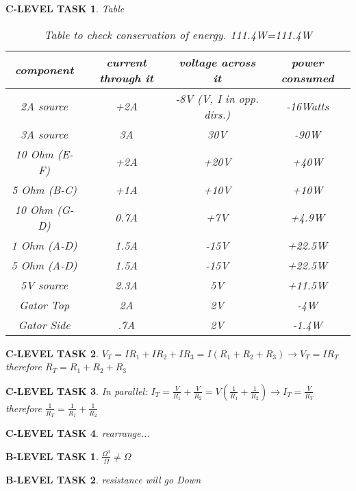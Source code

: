 \documentclass{book}
\numberwithin{equation}{section}
\newtheorem{blevel}{B-LEVEL TASK}
\newtheorem{clevel}{C-LEVEL TASK}
\theoremstyle{definition}
\begin{document}
\begin{clevel}Table\par
\begin{table}[H]
\begin{center}
\begin{tabular}{|c|c|c|c|} \hline
component &	current through it	& voltage across it	& power consumed \\ \hline
2A source	&+2A			&-8V (V, I in opp. dirs.)	&-16Watts\\ \hline
3A source	&3A			&30V	&-90W	\\ \hline
10 Ohm (E-F)	&+2A			&+20V	&+40W	\\ \hline
5 Ohm (B-C)	&+1A			&+10V	&+10W	\\ \hline
10 Ohm (G-D)	&0.7A			&+7V	&+4.9W	\\ \hline
1 Ohm (A-D)	&1.5A			&-15V	&+22.5W	\\ \hline
5 Ohm (A-D)	&1.5A			&-15V	&+22.5W	\\ \hline
5V source	&2.3A			&5V	&+11.5W	\\ \hline
Gator Top	&2A			&2V	&-4W	\\ \hline
Gator Side	&.7A			&2V	&-1.4W	\\ \hline
\end{tabular}
\caption{Table to check conservation of energy. 111.4W=111.4W}
\label{F:3CKT3}
\end{center}
\end{table}
\end{clevel}

\begin{clevel}$V_T=IR_1+IR_2+IR_3 = I(R_1+R_2+R_3) \rightarrow V_T=IR_T$\\
therefore $R_T=R_1+R_2+R_3$
\end{clevel}

\begin{clevel}In parallel: $I_T=\frac{V}{R_1}+\frac{V}{R_2} = V(\frac{1}{R_1}+\frac{1}{R_2}) \rightarrow I_T=\frac{V}{R_T}$\\
therefore $\frac{1}{R_T}=\frac{1}{R_1}+\frac{1}{R_2}$
\end{clevel}

\begin{clevel} rearrange...\end{clevel}

\begin{blevel} $\frac{\Omega^3}{\Omega} \neq \Omega$
\end{blevel}

\begin{blevel} resistance will go Down\end{blevel}
\end{document}
